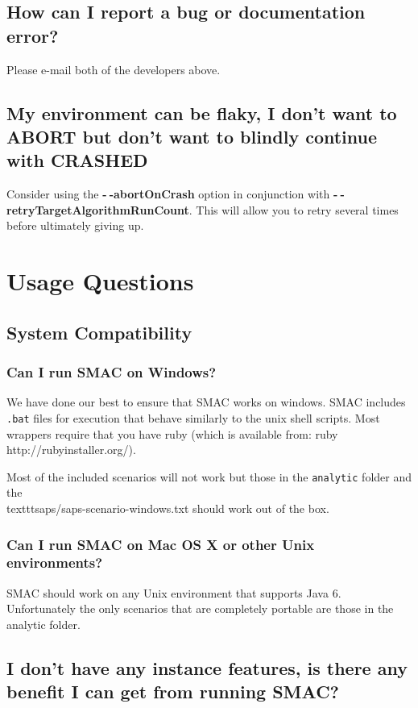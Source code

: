 \documentclass[11pt,letterpaper,oneside]{article}
\begin{document}
\subsection{How can I report a bug or documentation error?}
 Please e-mail both of the developers above.

\subsection{My environment can be flaky, I don't want to ABORT but don't want to blindly continue with CRASHED}

	Consider using the \textbf{-$~\!$-abortOnCrash} option in conjunction with \textbf{-$~\!$-retryTargetAlgorithmRunCount}. This will allow you to retry several times before ultimately giving up.


\section{Usage Questions}

\subsection{System Compatibility}
\subsubsection{Can I run SMAC on Windows?}

	We have done our best to ensure that SMAC works on windows. SMAC includes \texttt{.bat} files for execution that behave similarly to the unix shell scripts. Most wrappers require that you have ruby (which is available from: ruby http://rubyinstaller.org/). 
	
	Most of the included scenarios will not work but those in the \texttt{analytic} folder and the \\texttt{saps/saps-scenario-windows.txt} should work out of the box.

\subsubsection{Can I run SMAC on Mac OS X or other Unix environments?}

	SMAC should work on any Unix environment that supports Java 6. Unfortunately the only scenarios that are completely portable are those in the analytic folder.
 
 
 
\subsection{I don't have any instance features, is there any benefit I can get from running SMAC?}
\end{document}
